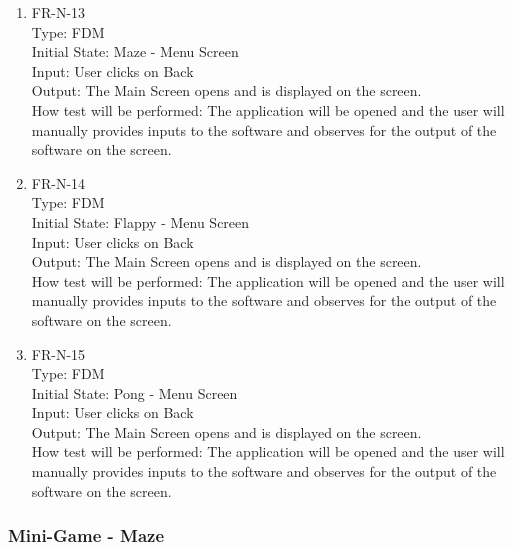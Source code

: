 \documentclass[12pt, titlepage]{article}
\begin{document}
\begin{enumerate}
\item{FR-N-13\\}
Type: FDM\\
Initial State: Maze - Menu Screen\\
Input: User clicks on Back\\
Output: The Main Screen opens and is displayed on the screen.\\
How test will be performed: The application will be opened and the user will manually provides inputs to the software and observes for the output of the software on the screen.\\

\item{FR-N-14\\}
Type: FDM\\
Initial State: Flappy - Menu Screen\\
Input: User clicks on Back\\
Output: The Main Screen opens and is displayed on the screen.\\
How test will be performed: The application will be opened and the user will manually provides inputs to the software and observes for the output of the software on the screen.\\

\item{FR-N-15\\}
Type: FDM\\
Initial State: Pong - Menu Screen\\
Input: User clicks on Back\\
Output: The Main Screen opens and is displayed on the screen.\\
How test will be performed: The application will be opened and the user will manually provides inputs to the software and observes for the output of the software on the screen.\\

\end{enumerate}

\subsubsection{Mini-Game - Maze}
\end{document}
